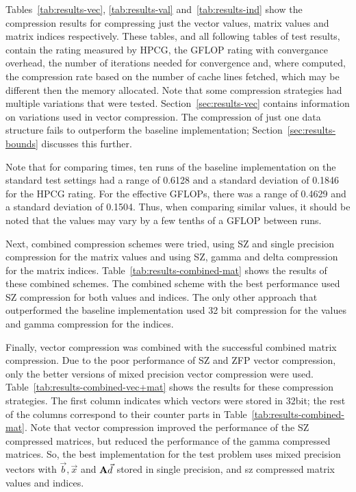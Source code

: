 Tables~\ref{tab:results-vec}, \ref{tab:results-val} and~\ref{tab:results-ind} show the compression results for compressing just the vector values, matrix values and matrix indices respectively.
These tables, and all following tables of test results, contain the rating measured by HPCG, the GFLOP rating with convergance overhead, the number of iterations needed for convergence and, where computed, the compression rate based on the number of cache lines fetched, which may be different then the memory allocated.
Note that some compression strategies had multiple variations that were tested.
Section~\ref{sec:results-vec} contains information on variations used in vector compression.
The compression of just one data structure fails to outperform the baseline implementation; Section~\ref{sec:results-bounds} discusses this further.

Note that for comparing times, ten runs of the baseline implementation on the standard test settings had a range of 0.6128 and a standard deviation of 0.1846 for the HPCG rating.
For the effective GFLOPs, there was a range of 0.4629 and a standard deviation of 0.1504.
Thus, when comparing similar values, it should be noted that the values may vary by a few tenths of a GFLOP between runs.






Next, combined compression schemes were tried, using SZ and single precision compression for the matrix values and using SZ, gamma and delta compression for the matrix indices.
Table~\ref{tab:results-combined-mat} shows the results of these combined schemes.
The combined scheme with the best performance used SZ compression for both values and indices.
The only other approach that outperformed the baseline implementation used 32 bit compression for the values and gamma compression for the indices.



Finally, vector compression was combined with the successful combined matrix compression.
Due to the poor performance of SZ and ZFP vector compression, only the better versions of mixed precision vector compression were used.
Table~\ref{tab:results-combined-vec+mat} shows the results for these compression strategies.
The first column indicates which vectors were stored in 32bit; the rest of the columns correspond to their counter parts in Table~\ref{tab:results-combined-mat}.
Note that vector compression improved the performance of the SZ compressed matrices, but reduced the performance of the gamma compressed matrices.
So, the best implementation for the test problem uses mixed precision vectors with \(\vec{b}, \vec{x}\) and \(\mathbf{A}\vec{d}\) stored in single precision, and sz compressed matrix values and indices.

